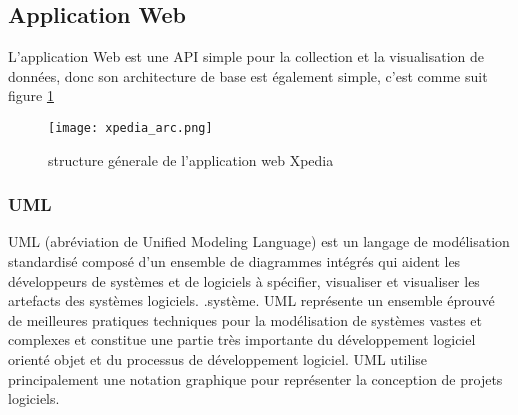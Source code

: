     \subsection{Application Web}
        L'application Web est une API simple pour la collection et la visualisation de données, donc son architecture de base est également simple, c'est comme suit figure \ref{fig:xpedia_arc}
        \begin{figure}[H]
            \centering
            \texttt{[image: xpedia\_arc.png]}
            \caption{structure génerale de l'application web Xpedia}\label{fig:xpedia_arc}
        \end{figure}
        \subsubsection{UML}
            UML (abréviation de Unified Modeling Language) est un langage de modélisation standardisé composé d'un ensemble de diagrammes intégrés qui aident les développeurs de systèmes et de logiciels à spécifier, visualiser et visualiser les artefacts des systèmes logiciels. .système. UML représente un ensemble éprouvé de meilleures pratiques techniques pour la modélisation de systèmes vastes et complexes et constitue une partie très importante du développement logiciel orienté objet et du processus de développement logiciel. UML utilise principalement une notation graphique pour représenter la conception de projets logiciels.

